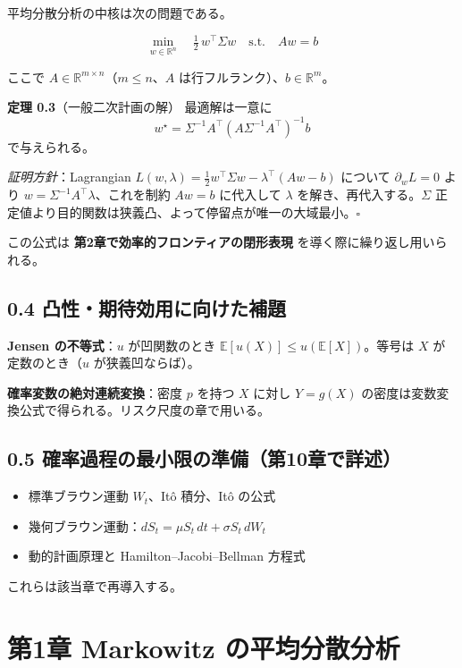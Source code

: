 \documentclass[11pt,a4paper]{report}
\begin{document}
平均分散分析の中核は次の問題である。

\[ \min_{w \in \mathbb{R}^n} \quad \tfrac{1}{2}\, w^\top \Sigma w \quad \text{s.t.} \quad A w = b \]

ここで $A \in \mathbb{R}^{m \times n}$（$m \le n$、$A$ は行フルランク）、$b \in \mathbb{R}^m$。

\textbf{定理 0.3}（一般二次計画の解） 最適解は一意に \[ w^\star = \Sigma^{-1} A^\top (A \Sigma^{-1} A^\top)^{-1} b \] で与えられる。

\emph{証明方針}：Lagrangian $L(w, \lambda) = \tfrac{1}{2} w^\top \Sigma w - \lambda^\top (Aw - b)$ について $\partial_w L = 0$ より $w = \Sigma^{-1} A^\top \lambda$、これを制約 $Aw = b$ に代入して $\lambda$ を解き、再代入する。$\Sigma$ 正定値より目的関数は狭義凸、よって停留点が唯一の大域最小。$\square$

この公式は \textbf{第2章で効率的フロンティアの閉形表現} を導く際に繰り返し用いられる。

\section{0.4 凸性・期待効用に向けた補題}

\textbf{Jensen の不等式}：$u$ が凹関数のとき $\mathbb{E}[u(X)] \le u(\mathbb{E}[X])$。等号は $X$ が定数のとき（$u$ が狭義凹ならば）。

\textbf{確率変数の絶対連続変換}：密度 $p$ を持つ $X$ に対し $Y = g(X)$ の密度は変数変換公式で得られる。リスク尺度の章で用いる。

\section{0.5 確率過程の最小限の準備（第10章で詳述）}

\begin{itemize}
\item 標準ブラウン運動 $W_t$、Itô 積分、Itô の公式
\item 幾何ブラウン運動：$dS_t = \mu S_t \, dt + \sigma S_t \, dW_t$
\item 動的計画原理と Hamilton–Jacobi–Bellman 方程式
\end{itemize}

これらは該当章で再導入する。

\noindent\hrulefill

\chapter{第1章 Markowitz の平均分散分析}
\end{document}

